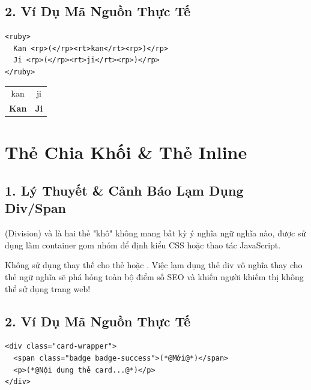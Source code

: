 \subsection{2. Ví Dụ Mã Nguồn Thực Tế}
\begin{codeWindow}
\begin{lstlisting}[language=HTML5]
<ruby>
  Kan <rp>(</rp><rt>kan</rt><rp>)</rp>
  Ji <rp>(</rp><rt>ji</rt><rp>)</rp>
</ruby>
\end{lstlisting}
\end{codeWindow}

\begin{browserWindow}
\sffamily\small
\begin{tabular}{c c}
\tiny kan & \tiny ji \\
\bfseries Kan & \bfseries Ji \\
\end{tabular}
\end{browserWindow}

\section{Thẻ Chia Khối  \& Thẻ Inline }
\subsection{1. Lý Thuyết \& Cảnh Báo Lạm Dụng Div/Span}
 (Division) và  là hai thẻ "khô" không mang bất kỳ ý nghĩa ngữ nghĩa nào, được sử dụng làm container gom nhóm để định kiểu CSS hoặc thao tác JavaScript.

\begin{warnBox}
Không sử dụng  thay thế cho thẻ  hoặc . Việc lạm dụng thẻ div vô nghĩa thay cho thẻ ngữ nghĩa sẽ phá hỏng toàn bộ điểm số SEO và khiến người khiếm thị không thể sử dụng trang web!
\end{warnBox}

\subsection{2. Ví Dụ Mã Nguồn Thực Tế}
\begin{codeWindow}
\begin{lstlisting}[language=HTML5]
<div class="card-wrapper">
  <span class="badge badge-success">(*@Mới@*)</span>
  <p>(*@Nội dung thẻ card...@*)</p>
</div>
\end{lstlisting}
\end{codeWindow}

